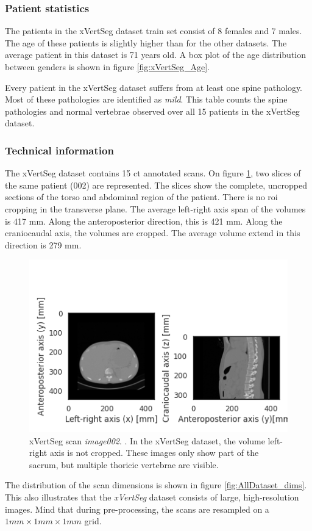 \subsubsection{Patient statistics}

The patients in the xVertSeg dataset train set consist of 8 females and 7 males.
The age of these patients is slightly higher than for the other datasets.
The average patient in this dataset is 71 years old.
A box plot of the age distribution between genders is shown in figure \ref{fig:xVertSeg_Age}. 

\begin{table}
    \centering
        
        \caption{Every patient in the xVertSeg dataset suffers from at least one spine pathology.
        Most of these pathologies are identified as \textit{mild}.
        This table counts the spine pathologies and normal vertebrae observed over all 15 patients in the xVertSeg dataset.}   
\end{table}

\subsubsection{Technical information}

The xVertSeg dataset contains 15 \acrshort{ct} annotated scans. 
On figure \ref{fig:xVertSeg_image002}, two slices of the same patient (002) are represented.
The slices show the complete, uncropped sections of the torso and abdominal region of the patient. 
There is no \acrshort{roi} cropping in the transverse plane.
The average left-right axis span of the volumes is 417 mm. Along the anteroposterior direction, this is 421 mm. 
Along the craniocaudal axis, the volumes are cropped. The average volume extend in this direction is 279 mm.

\begin{figure}
    \centering
    \includegraphics[width=.95\textwidth]{automated_graphs/xVertSeg_image002.png}
    \caption{xVertSeg scan \textit{image002}. \label{fig:xVertSeg_image002}. In the xVertSeg dataset, the volume left-right axis is not cropped. These images only show part of the sacrum, but multiple thoricic vertebrae are visible.}
\end{figure}

The distribution of the scan dimensions is shown in figure \ref{fig:AllDataset_dims}. This also illustrates that the \textit{xVertSeg} dataset consists of large, high-resolution images.
Mind that during pre-processing, the scans are resampled on a $1mm \times 1mm \times 1mm$ grid.